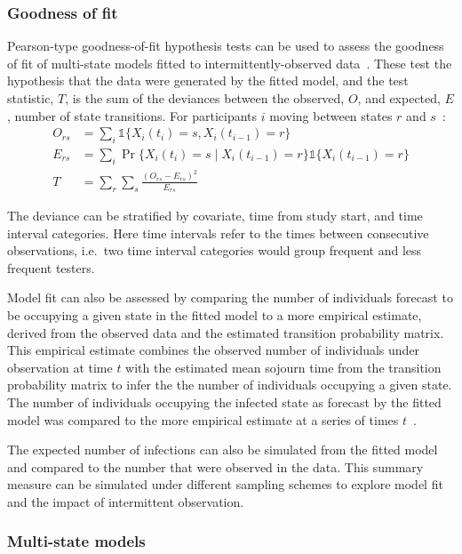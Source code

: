 \subsubsection{Goodness of fit}

Pearson-type goodness-of-fit hypothesis tests can be used to assess the goodness of fit of multi-state models fitted to intermittently-observed data~\parencite{Aguirre-Hernandez2002-vn}. These test the hypothesis that the data were generated by the fitted model, and the test statistic, $T$, is the sum of the deviances between the observed, $O$, and expected, $E$, number of state transitions. For participants $i$ moving between states $r$ and $s$~\parencite{Titman2009-nk}:
%
\begin{align*}
    O_{rs} & = \sum_i\mathds{1}\{X_i(t_i) = s, X_i(t_{i-1}) = r\}                            \\
    E_{rs} & = \sum_i\Pr\{X_i(t_i) = s \mid X_i(t_{i-1}) = r\}\mathds{1}\{X_i(t_{i-1}) = r\} \\
    T      & = \sum_{r}\sum_{s}\frac{{(O_{rs} - E_{rs})}^2}{E_{rs}}
\end{align*}

The deviance can be stratified by covariate, time from study start, and time interval categories. Here time intervals refer to the times between consecutive observations, i.e.\ two time interval categories would group frequent and less frequent testers.

Model fit can also be assessed by comparing the number of individuals forecast to be occupying a given state in the fitted model to a more empirical estimate, derived from the observed data and the estimated transition probability matrix. This empirical estimate combines the observed number of individuals under observation at time $t$ with the estimated mean sojourn time from the transition probability matrix to infer the the number of individuals occupying a given state. The number of individuals occupying the infected state as forecast by the fitted model was compared to the more empirical estimate at a series of times $t$~\parencite{Jackson2011-ry}.

The expected number of infections can also be simulated from the fitted model and compared to the number that were observed in the data. This summary measure can be simulated under different sampling schemes to explore model fit and the impact of intermittent observation.

\subsubsection{Multi-state models}

